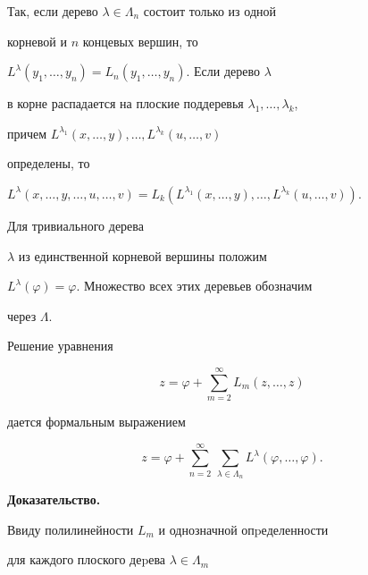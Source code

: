 Так, если дерево $\lambda\in\Lambda_n$ состоит только из одной


корневой и $n$ концевых вершин, то


$L^\lambda(y_1,\dotsc,y_n)= L_n(y_1,\dotsc,y_n)$. Если дерево $\lambda$


в корне распадается на плоские поддеревья $\lambda_1,\dotsc,\lambda_k$,


причем $L^{\lambda_1}(x,\dotsc,y),\dotsc,L^{\lambda_k}(u,\dotsc,v)$


определены, то


$L^\lambda(x,\dotsc,y,\dotsc,u,\dotsc,v)=


L_k(L^{\lambda_1}(x,\dotsc,y), \dotsc, L^{\lambda_k}(u,\dotsc,v))$.


Для тривиального дерева


$\lambda$ из единственной корневой вершины положим


$L^\lambda(\varphi)=\varphi$. Множество всех этих деревьев обозначим


через $\Lambda$.





\begin{lem}


\label{formlemma}


Решение уравнения


\begin{equation}


\label{formlemm=2}


z=\varphi+\sum_{m=2}^{\infty}L_m(z,\dotsc,z)


\end{equation}


дается формальным выражением


\begin{equation}


\label{z=}


z=\varphi+\sum_{n=2}^{\infty}\,\sum_{\lambda\in\Lambda_n}


L^\lambda(\varphi,\dotsc,\varphi).


\end{equation}


\end{lem}





{\bf Доказательство.}


Ввиду полилинейности $L_m$ и однозначной опpеделенности


для каждого плоского деpева $\lambda \in\Lambda_m$


